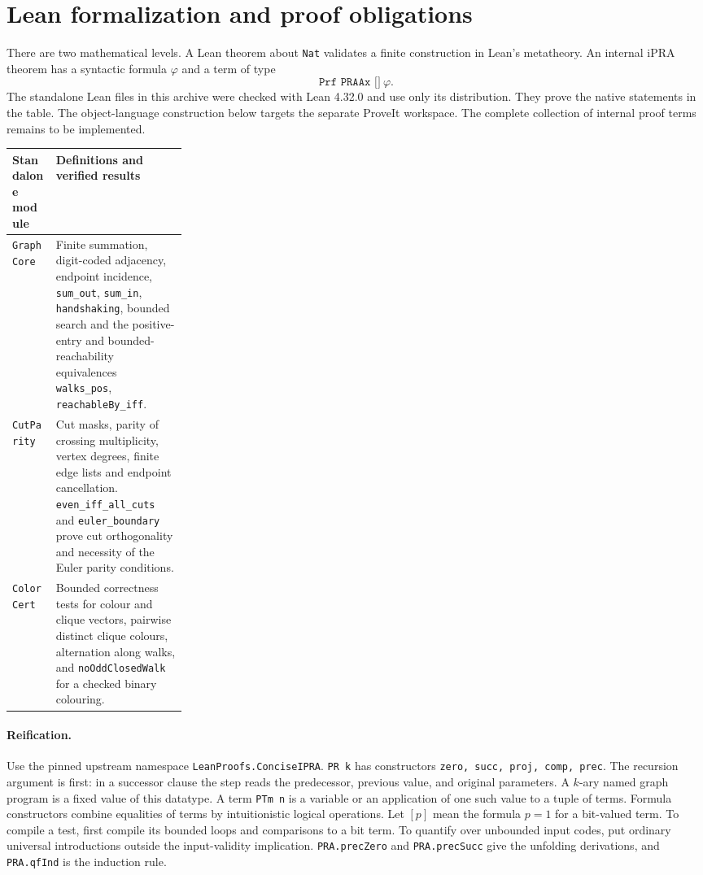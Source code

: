 \section{Lean formalization and proof obligations}\label{sec:lean}
There are two mathematical levels. A Lean theorem about \texttt{Nat} validates
a finite construction in Lean's metatheory. An internal iPRA theorem has a
syntactic formula $\varphi$ and a term of type
\[
             \texttt{Prf PRAAx []}\ \varphi .
\]
The standalone Lean files in this archive were checked with Lean 4.32.0 and
use only its distribution. They prove the native statements in the table.
The object-language construction below targets the separate ProveIt
workspace. The complete collection of internal proof terms remains to be
implemented.

\noindent\begin{tabularx}{\linewidth}{@{}p{0.25\linewidth}X@{}}
\toprule
Standalone module & Definitions and verified results\\ \midrule
\texttt{GraphCore} & Finite summation, digit-coded adjacency, endpoint incidence,
\texttt{sum\_out}, \texttt{sum\_in}, \texttt{handshaking}, bounded search and
the positive-entry and bounded-reachability equivalences
\texttt{walks\_pos}, \texttt{reachableBy\_iff}.\\[3pt]
\texttt{CutParity} & Cut masks, parity of crossing multiplicity, vertex
degrees, finite edge lists and endpoint cancellation. \texttt{even\_iff\_all\_cuts}
and \texttt{euler\_boundary} prove cut orthogonality and necessity of the
Euler parity conditions.\\[3pt]
\texttt{ColorCert} & Bounded correctness tests for colour and clique vectors,
pairwise distinct clique colours, alternation along walks, and
\texttt{noOddClosedWalk} for a checked binary colouring.\\ \bottomrule
\end{tabularx}

\paragraph{Reification.}
Use the pinned upstream namespace \texttt{LeanProofs.ConciseIPRA}.
\texttt{PR k} has constructors \texttt{zero, succ, proj, comp, prec}.
The recursion argument is first: in a successor clause the step reads the
predecessor, previous value, and original parameters. A $k$-ary named graph
program is a fixed value of this datatype. A term \texttt{PTm n} is a variable
or an application of one such value to a tuple of terms. Formula constructors
combine equalities of terms by intuitionistic logical operations. Let $[p]$
mean the formula $p=1$ for a bit-valued term. To compile a test, first compile
its bounded loops and comparisons to a bit term. To quantify over unbounded
input codes, put ordinary universal introductions outside the input-validity
implication. \texttt{PRA.precZero} and \texttt{PRA.precSucc} give the unfolding
derivations, and \texttt{PRA.qfInd} is the induction rule.

